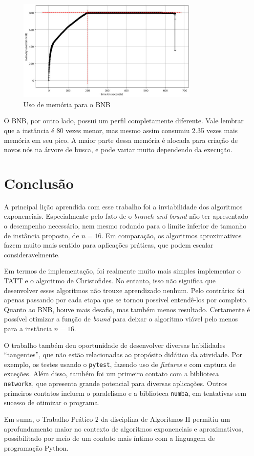 \documentclass{article}
\begin{document}
\begin{figure} [H]
	\includegraphics[width=9cm]{mem-bnb}
	\centering
	\captionsetup{labelformat=empty}
	\caption{Uso de memória para o BNB}
\end{figure}

O BNB, por outro lado, possui um perfil completamente diferente. Vale lembrar que a instância é 80 vezes menor, mas mesmo assim consumiu 2.35 vezes mais memória em seu pico. A maior parte dessa memória é alocada para criação de novos nós na árvore de busca, e pode variar muito dependendo da execução.

\section{Conclusão}

A principal lição aprendida com esse trabalho foi a inviabilidade dos algoritmos exponenciais. Especialmente pelo fato de o \textit{branch and bound} não ter apresentado o desempenho necessário, nem mesmo rodando para o limite inferior de tamanho de instância proposto, de \( n = 16 \). Em comparação, os algoritmos aproximativos fazem muito mais sentido para aplicações práticas, que podem escalar consideravelmente.

Em termos de implementação, foi realmente muito mais simples implementar o TATT e o algoritmo de Christofides. No entanto, isso não significa que desenvolver esses algoritmos não trouxe aprendizado nenhum. Pelo contrário: foi apenas passando por cada etapa que se tornou possível entendê-los por completo. Quanto ao BNB, houve mais desafio, mas também menos resultado. Certamente é possível otimizar a função de \textit{bound} para deixar o algoritmo viável pelo menos para a instância \( n = 16 \).

O trabalho também deu oportunidade de desenvolver diversas habilidades ``tangentes'', que não estão relacionadas ao propósito didático da atividade. Por exemplo, os testes usando o \texttt{pytest}, fazendo uso de \textit{fixtures} e com captura de exceções. Além disso, também foi um primeiro contato com a biblioteca \texttt{networkx}, que apresenta grande potencial para diversas aplicações. Outros primeiros contatos incluem o paralelismo e a biblioteca \texttt{numba}, em tentativas sem sucesso de otimizar o programa.

Em suma, o Trabalho Prático 2 da disciplina de Algoritmos II permitiu um aprofundamento maior no contexto de algoritmos exponenciais e aproximativos, possibilitado por meio de um contato mais íntimo com a linguagem de programação Python.

\end{document}
